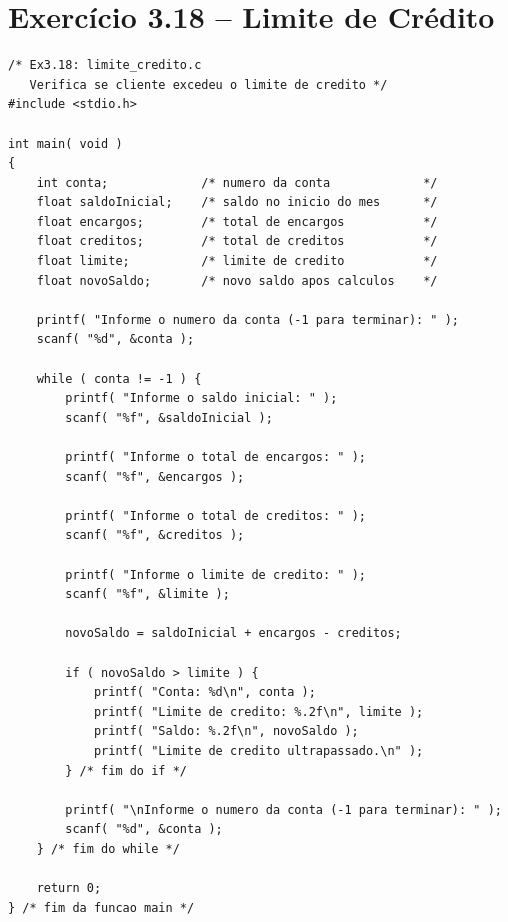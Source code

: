 \documentclass[12pt,a4paper]{article}
\begin{document}
\newpage

\section{Exercício 3.18 -- Limite de Crédito}

\begin{respostabox}
\begin{lstlisting}
/* Ex3.18: limite_credito.c
   Verifica se cliente excedeu o limite de credito */
#include <stdio.h>

int main( void )
{
    int conta;             /* numero da conta             */
    float saldoInicial;    /* saldo no inicio do mes      */
    float encargos;        /* total de encargos           */
    float creditos;        /* total de creditos           */
    float limite;          /* limite de credito           */
    float novoSaldo;       /* novo saldo apos calculos    */

    printf( "Informe o numero da conta (-1 para terminar): " );
    scanf( "%d", &conta );

    while ( conta != -1 ) {
        printf( "Informe o saldo inicial: " );
        scanf( "%f", &saldoInicial );

        printf( "Informe o total de encargos: " );
        scanf( "%f", &encargos );

        printf( "Informe o total de creditos: " );
        scanf( "%f", &creditos );

        printf( "Informe o limite de credito: " );
        scanf( "%f", &limite );

        novoSaldo = saldoInicial + encargos - creditos;

        if ( novoSaldo > limite ) {
            printf( "Conta: %d\n", conta );
            printf( "Limite de credito: %.2f\n", limite );
            printf( "Saldo: %.2f\n", novoSaldo );
            printf( "Limite de credito ultrapassado.\n" );
        } /* fim do if */

        printf( "\nInforme o numero da conta (-1 para terminar): " );
        scanf( "%d", &conta );
    } /* fim do while */

    return 0;
} /* fim da funcao main */
\end{lstlisting}
\end{respostabox}

\end{document}
